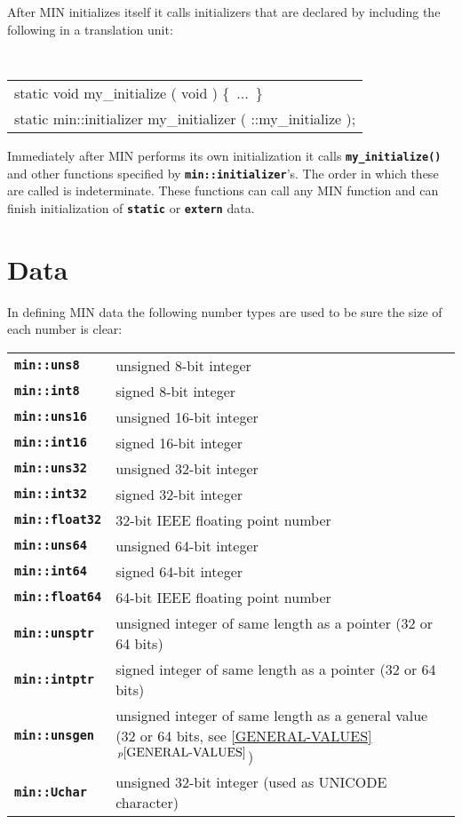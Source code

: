 \documentclass[12pt]{article}
\makeatletter
\newcommand{\TT}[1]{{\tt \bfseries #1}}
\newcommand{\ttindex}[1]{\index{#1@{\tt #1}}}
\newcommand{\minkey}[1]%
           {\TT{min::#1}\ttindex{min::#1}\ttindex{#1}}
\newcommand{\itemref}[1]{\ref{#1}$\,^{p\pageref{#1}}$}
\newcommand{\EOL}{\penalty \exhyphenpenalty}
\newcommand{\LABEL}[1]{\label{#1}}
\makeatother
\begin{document}
After MIN initializes itself it calls initializers that are
declared by including the following in a translation unit:

\begin{center}
\tt
\begin{tabular}{l}
static void my\_initialize ( void ) \{~...~\} \\
static min::initializer my\_initializer ( ::my\_initialize ); \\
\end{tabular}
\end{center}

Immediately after MIN performs its own initialization
it calls \TT{my\_initialize()} and other functions specified by
\TT{min::\EOL initializer}'s.  The order in which these
are called is indeterminate.  These functions can call any
MIN function and can finish initialization of \TT{static} or
\TT{extern} data.

\section{Data}

In defining MIN data the following number types are used to be sure
the size of each number is clear:
\begin{center}
\begin{tabular}{l@{~~~~~}p{4.5in}}
\minkey{uns8}	& unsigned 8-bit integer \\
\minkey{int8}	& signed 8-bit integer \\
\minkey{uns16}	& unsigned 16-bit integer \\
\minkey{int16}	& signed 16-bit integer \\
\minkey{uns32}	& unsigned 32-bit integer \\
\minkey{int32}	& signed 32-bit integer \\
\minkey{float32}	& 32-bit IEEE floating point number \\
\minkey{uns64}	& unsigned 64-bit integer \\
\minkey{int64}	& signed 64-bit integer \\
\minkey{float64}	& 64-bit IEEE floating point number \\
\minkey{unsptr}	& unsigned integer of same length as a pointer (32 or 64 bits)
                  \\
\minkey{intptr}	& signed integer of same length as a pointer (32 or 64 bits)
                  \\
\minkey{unsgen}	& unsigned integer of same length as a general value
                  (32 or 64 bits, see \itemref{GENERAL-VALUES})
                  \\
\minkey{Uchar}	& unsigned 32-bit integer (used as UNICODE character) \\
\end{tabular}
\end{center}%
\LABEL{MIN::UNS8}%
\LABEL{MIN::INT8}%
\LABEL{MIN::UNS16}%
\LABEL{MIN::INT16}%
\LABEL{MIN::UNS32}%
\LABEL{MIN::INT32}%
\LABEL{MIN::FLOAT32}%
\LABEL{MIN::UNS64}%
\LABEL{MIN::INT64}%
\LABEL{MIN::FLOAT64}%
\LABEL{MIN::UNSPTR}%
\LABEL{MIN::INTPTR}%
\LABEL{MIN::UNSGEN}%
\label{INT}%
\label{UNS}
\end{document}
